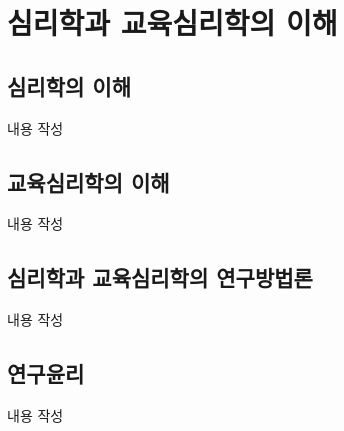 \section{심리학과 교육심리학의 이해}

\subsection{심리학의 이해}
내용 작성

\subsection{교육심리학의 이해}
내용 작성

\subsection{심리학과 교육심리학의 연구방법론}
내용 작성

\subsection{연구윤리}
내용 작성
